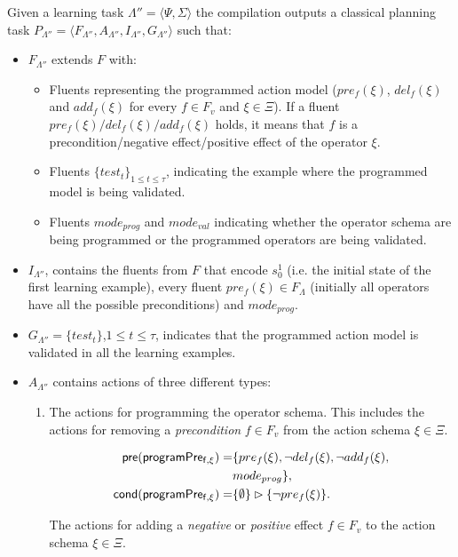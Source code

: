 \documentclass[letterpaper]{article} %
\newcommand{\tup}[1]{{\langle #1 \rangle}}
\newcommand{\pre}{\mathsf{pre}}     %
\newcommand{\cond}{\mathsf{cond}}   %
\begin{document}
Given a learning task $\Lambda''=\tup{\Psi,\Sigma}$ the compilation outputs a classical planning task $P_{\Lambda''}=\tup{F_{\Lambda''},A_{\Lambda''},I_{\Lambda''},G_{\Lambda''}}$ such that:
\begin{itemize}
\item $F_{\Lambda''}$ extends $F$ with:
\begin{itemize}
\item Fluents representing the programmed action model ($pre_f(\xi)$, $del_f(\xi)$ and $add_f(\xi)$ for every $f\in F_v$ and $\xi \in \Xi$). If a fluent $pre_f(\xi)/del_f(\xi)/add_f(\xi)$ holds, it means that $f$ is a precondition/negative effect/positive effect of the operator $\xi$. 
\item Fluents $\{test_t\}_{1\leq t\leq \tau}$, indicating the example where the programmed model is being validated.
\item Fluents $mode_{prog}$ and $mode_{val}$ indicating whether the operator schema are being programmed or the programmed operators are being validated.
\end{itemize}
\item $I_{\Lambda''}$, contains the fluents from $F$ that encode $s_0^1$ (i.e. the initial state of the first learning example), every fluent $pre_f(\xi)\in F_{\Lambda}$ (initially all operators have all the possible preconditions) and $mode_{prog}$. 
\item $G_{\Lambda''}=\{test_t\}$,{\small $1\leq t\leq \tau$}, indicates that the programmed action model is validated in all the learning examples.
\item $A_{\Lambda''}$ contains actions of three different types:
\begin{enumerate}
\item The actions for programming the operator schema. This includes the actions for removing a {\em precondition} $f\in F_v$ from the action schema $\xi\in\Xi$.

\begin{small}
\begin{align*}
\hspace*{7pt}\pre(\mathsf{programPre_{f,\xi}})=&\{pre_{f}(\xi),\neg del_{f}(\xi),\neg add_{f}(\xi),\\
& mode_{prog}\},\\    
\cond(\mathsf{programPre_{f,\xi}})=&\{\emptyset\}\rhd\{\neg pre_{f}(\xi)\}.
\end{align*}
\end{small}

The actions for adding a {\em negative} or {\em positive} effect $f\in F_v$ to the action schema $\xi\in\Xi$.


\end{enumerate}
\end{itemize}
\end{document}
